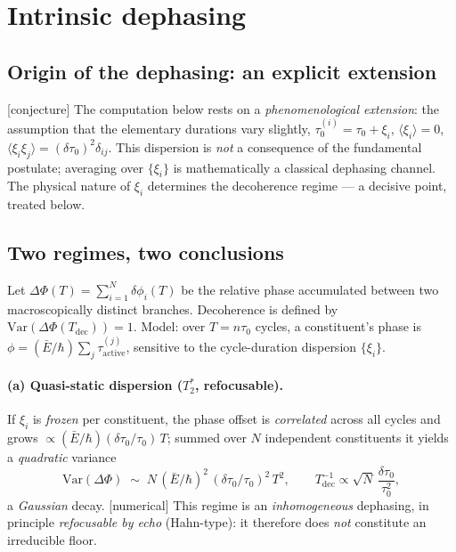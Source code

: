 \documentclass[11pt,a4paper]{article}
\newcommand{\statut}[1]{{\footnotesize\textsf{[#1]}}}
\theoremstyle{plain}
\theoremstyle{definition}
\theoremstyle{remark}
\begin{document}
\section{Intrinsic dephasing}\label{sec:deco}
\subsection{Origin of the dephasing: an explicit extension}\label{sec:disp}
\statut{conjecture} The computation below rests on a \emph{phenomenological
extension}: the assumption that the elementary durations vary slightly,
$\tau_0^{(i)}=\tau_0+\xi_i$, $\langle\xi_i\rangle=0$,
$\langle\xi_i\xi_j\rangle=(\delta\tau_0)^2\delta_{ij}$. This dispersion is
\emph{not} a consequence of the fundamental postulate; averaging over $\{\xi_i\}$
is mathematically a classical dephasing channel. The physical nature of $\xi_i$
determines the decoherence regime --- a decisive point, treated below.

\subsection{Two regimes, two conclusions}
Let $\Delta\Phi(T)=\sum_{i=1}^{N}\delta\phi_i(T)$ be the relative phase accumulated
between two macroscopically distinct branches. Decoherence is defined by
$\mathrm{Var}(\Delta\Phi(T_{\mathrm{dec}}))=1$. Model: over $T=n\tau_0$ cycles, a constituent's phase is $\phi=(\bar E/\hbar)\sum_j\tau_{\mathrm{active}}^{(j)}$, sensitive to the cycle-duration dispersion $\{\xi_i\}$.

\paragraph{(a) Quasi-static dispersion ($T_2^\ast$, refocusable).} If $\xi_i$ is
\emph{frozen} per constituent, the phase offset is \emph{correlated} across all cycles and grows $\propto(\bar E/\hbar)(\delta\tau_0/\tau_0)\,T$; summed over $N$ independent constituents it yields a \emph{quadratic} variance
\[
\mathrm{Var}(\Delta\Phi)\;\sim\; N\,(\bar E/\hbar)^2\,(\delta\tau_0/\tau_0)^2\,T^2,
\qquad
T_{\mathrm{dec}}^{-1}\propto \sqrt{N}\,\frac{\delta\tau_0}{\tau_0^2},
\]
a \emph{Gaussian} decay. \statut{numerical} This regime is an \emph{inhomogeneous}
dephasing, in principle \emph{refocusable by echo} (Hahn-type): it therefore does
\emph{not} constitute an irreducible floor.
\end{document}
